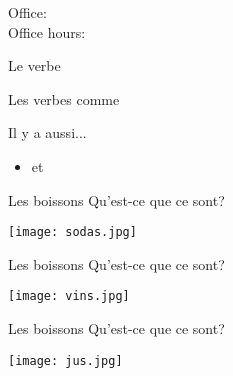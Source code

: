\documentclass{beamer}
\subtitle[Boissons et verbes]{Les boissons et plus de verbes}
\begin{document}
  \begin{frame}
    \titlepage
    \tiny{Office: \\
          Office hours: }
  \end{frame}

  \begin{frame}{Le verbe }
    \begin{center}
      
    \end{center}
  \end{frame}

  \begin{frame}{Les verbes comme }
    \begin{center}
      
    \end{center}
    Il y a aussi...
    \begin{itemize}
      \item {} et 
    \end{itemize}
  \end{frame}

  \begin{frame}{Les boissons}
    Qu'est-ce que ce sont? \underline{}
    \begin{center}
      \texttt{[image: sodas.jpg]}
    \end{center}
  \end{frame}

  \begin{frame}{Les boissons}
    Qu'est-ce que ce sont? \\
    \underline{}
    \begin{center}
      \texttt{[image: vins.jpg]}
    \end{center}
  \end{frame}

  \begin{frame}{Les boissons}
    Qu'est-ce que ce sont? \\
    \underline{}
    \begin{center}
      \texttt{[image: jus.jpg]}
    \end{center}
  \end{frame}
\end{document}
